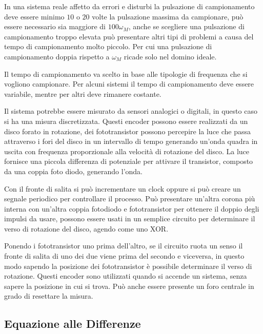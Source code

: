 \documentclass{article}
\numberwithin{equation}{subsection}
\begin{document}
In una sistema reale affetto da errori e disturbi la pulsazione di campionamento deve essere 
minimo $10$ o $20$ volte la pulsazione massima da campionare, può essere necessario sia maggiore di $100\omega_M$, anche se scegliere una pulsazione di 
campionamento troppo elevata può presentare altri tipi di problemi a causa del tempo di campionamento molto piccolo. 
Per cui una pulsazione di campionamento doppia rispetto a $\omega_M$ ricade solo nel domino ideale. 


Il tempo di campionamento va scelto in base alle tipologie di frequenza che si vogliono campionare. Per alcuni sistemi il tempo di campionamento deve essere variabile, 
mentre per altri deve rimanere costante. 


Il sistema potrebbe essere misurato da sensori analogici o digitali, in questo caso si ha una misura discretizzata. Questi encoder possono essere realizzati da un disco 
forato in rotazione, dei fototransistor possono percepire la luce che passa attraverso i fori del disco in un intervallo di tempo generando un'onda quadra in uscita con 
frequenza proporzionale alla velocità di rotazione del disco. La luce fornisce una piccola differenza di potenziale per attivare il transistor, composto da una coppia 
foto diodo, generando l'onda. 

Con il fronte di salita si può incrementare un clock oppure si può creare un segnale periodico per controllare il processo. 
Può presentare un'altra corona più interna con un'altra coppia fotodiodo e fototransistor per ottenere il doppio degli impulsi da usare, possono essere usati in un semplice 
circuito per determinare il verso di rotazione del disco, agendo come uno XOR. 

Ponendo i fototransistor uno prima dell'altro, se il circuito ruota un senso il fronte di salita di uno dei due viene prima del secondo e viceversa, in questo modo 
sapendo la posizione dei fototransistor è possibile determinare il verso di rotazione. 
Questi encoder sono utilizzati quando si accende un sistema, senza sapere la posizione in cui si trova. Può anche essere presente un foro centrale in grado di 
resettare la misura. 

\subsection{Equazione alle Differenze}
\end{document}
